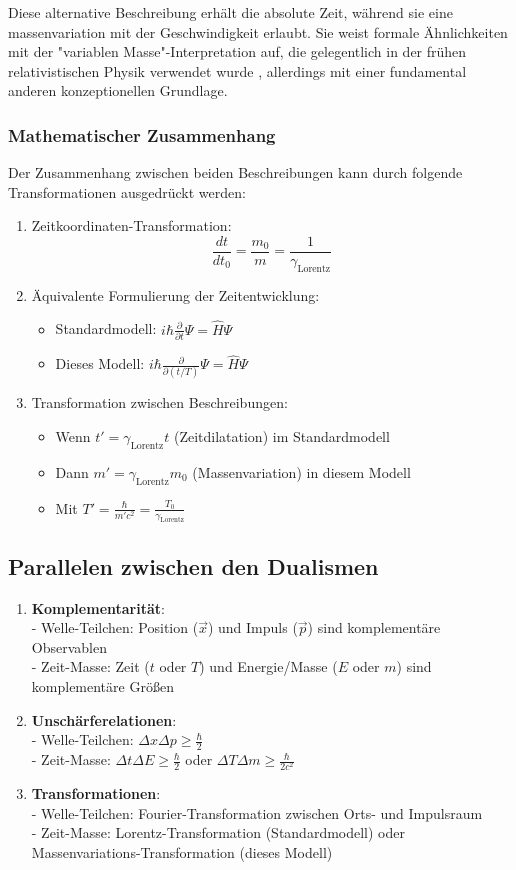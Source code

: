 \documentclass[a4paper,12pt]{article}
\newcommand{\Tzero}{T_0}
\newcommand{\vecx}{\vec{x}}
\newcommand{\gammaf}{\gamma_{\text{Lorentz}}}
\begin{document}
	Diese alternative Beschreibung erhält die absolute Zeit, während sie eine massenvariation mit der Geschwindigkeit erlaubt. Sie weist formale Ähnlichkeiten mit der "variablen Masse"-Interpretation auf, die gelegentlich in der frühen relativistischen Physik verwendet wurde \cite{Tolman1917}, allerdings mit einer fundamental anderen konzeptionellen Grundlage.
	
	\subsubsection{Mathematischer Zusammenhang}
	Der Zusammenhang zwischen beiden Beschreibungen kann durch folgende Transformationen ausgedrückt werden:
	\begin{enumerate}
		\item Zeitkoordinaten-Transformation:
		\[
		\frac{dt}{dt_0} = \frac{m_0}{m} = \frac{1}{\gammaf}
		\]
		\item Äquivalente Formulierung der Zeitentwicklung:
		\begin{itemize}
			\item Standardmodell: $i\hbar\frac{\partial}{\partial t}\Psi = \hat{H}\Psi$
			\item Dieses Modell: $i\hbar\frac{\partial}{\partial (t/T)}\Psi = \hat{H}\Psi$
		\end{itemize}
		\item Transformation zwischen Beschreibungen:
		\begin{itemize}
			\item Wenn $t' = \gammaf t$ (Zeitdilatation) im Standardmodell
			\item Dann $m' = \gammaf m_0$ (Massenvariation) in diesem Modell
			\item Mit $T' = \frac{\hbar}{m'c^2} = \frac{\Tzero}{\gammaf}$
		\end{itemize}
	\end{enumerate}
	
	\subsection{Parallelen zwischen den Dualismen}
	\begin{enumerate}
		\item \textbf{Komplementarität}: \\
		- Welle-Teilchen: Position ($\vecx$) und Impuls ($\vec{p}$) sind komplementäre Observablen \\
		- Zeit-Masse: Zeit ($t$ oder $T$) und Energie/Masse ($E$ oder $m$) sind komplementäre Größen
		\item \textbf{Unschärferelationen}: \\
		- Welle-Teilchen: $\Delta x \Delta p \geq \frac{\hbar}{2}$ \\
		- Zeit-Masse: $\Delta t \Delta E \geq \frac{\hbar}{2}$ oder $\Delta T \Delta m \geq \frac{\hbar}{2c^2}$
		\item \textbf{Transformationen}: \\
		- Welle-Teilchen: Fourier-Transformation zwischen Orts- und Impulsraum \\
		- Zeit-Masse: Lorentz-Transformation (Standardmodell) oder Massenvariations-Transformation (dieses Modell)
	\end{enumerate}
	
\end{document}
